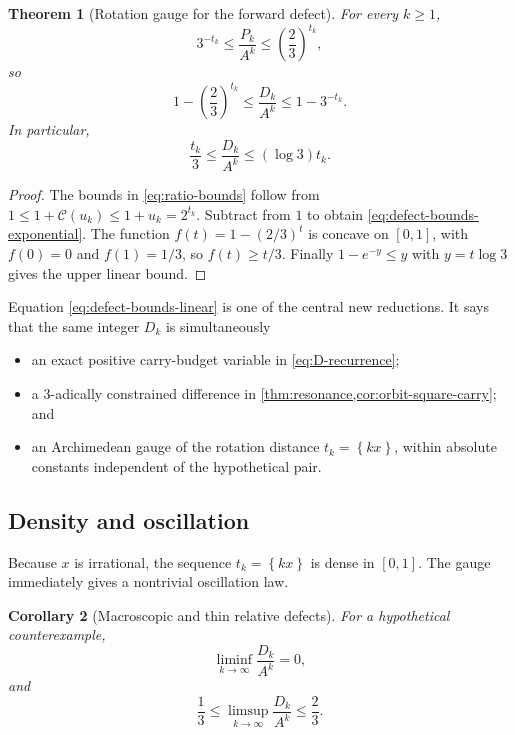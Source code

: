 \documentclass[11pt]{article}
\newtheorem{theorem}{Theorem}[section]
\newtheorem{corollary}[theorem]{Corollary}
\theoremstyle{definition}
\theoremstyle{remark}
\newcommand{\fracpart}[1]{\left\{#1\right\}}
\newcommand{\Cantor}{\mathcal C}
\begin{document}
\begin{theorem}[Rotation gauge for the forward defect]\label{thm:rotation-gauge}
For every $k\ge1$,
\begin{equation}\label{eq:ratio-bounds}
  3^{-t_k}
  \le\frac{P_k}{A^k}
  \le\left(\frac23\right)^{t_k},
\end{equation}
so
\begin{equation}\label{eq:defect-bounds-exponential}
  1-\left(\frac23\right)^{t_k}
  \le\frac{D_k}{A^k}
  \le1-3^{-t_k}.
\end{equation}
In particular,
\begin{equation}\label{eq:defect-bounds-linear}
 \boxed{
  \frac{t_k}{3}
  \le\frac{D_k}{A^k}
  \le(\log3)t_k.}
\end{equation}
\end{theorem}

\begin{proof}
The bounds in \eqref{eq:ratio-bounds} follow from
$1\le1+\Cantor(u_k)\le1+u_k=2^{t_k}$.  Subtract from $1$ to obtain
\eqref{eq:defect-bounds-exponential}.  The function
$f(t)=1-(2/3)^t$ is concave on $[0,1]$, with $f(0)=0$ and $f(1)=1/3$, so
$f(t)\ge t/3$.  Finally $1-e^{-y}\le y$ with $y=t\log3$ gives the upper
linear bound.
\end{proof}

Equation \eqref{eq:defect-bounds-linear} is one of the central new reductions.
It says that the same integer $D_k$ is simultaneously

\begin{itemize}
\item an exact positive carry-budget variable in \eqref{eq:D-recurrence};
\item a $3$-adically constrained difference in
\cref{thm:resonance,cor:orbit-square-carry}; and
\item an Archimedean gauge of the rotation distance $t_k=\fracpart{kx}$,
within absolute constants independent of the hypothetical pair.
\end{itemize}

\subsection{Density and oscillation}

Because $x$ is irrational, the sequence $t_k=\fracpart{kx}$ is dense in
$[0,1]$.  The gauge immediately gives a nontrivial oscillation law.

\begin{corollary}[Macroscopic and thin relative defects]\label{cor:defect-oscillation}
For a hypothetical counterexample,
\[
  \liminf_{k\to\infty}\frac{D_k}{A^k}=0,
\]
and
\[
  \frac13\le
  \limsup_{k\to\infty}\frac{D_k}{A^k}
  \le\frac23.
\]
\end{corollary}
\end{document}
